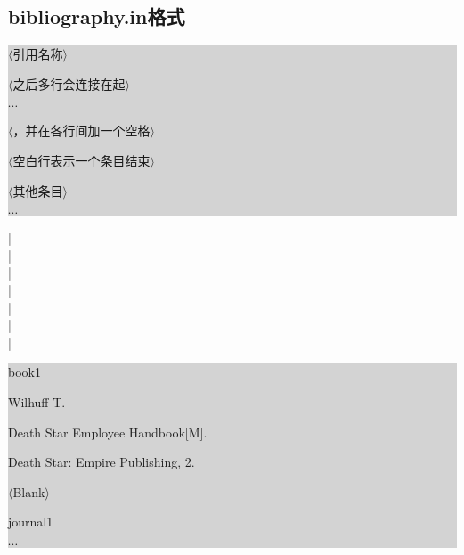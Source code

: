 \documentclass[a4paper]{article}
\begin{document}
	\subsection{bibliography.in格式}
	\begin{body}
		\colorbox{lightgray}{\parbox[t]{0.4\linewidth}{\setlength{\parindent}{0pt}%
				$\langle$引用名称$\rangle$\par
				$\langle$之后多行会连接在起$\rangle$\par
				\quad$\cdots$\par
				$\langle$，并在各行间加一个空格$\rangle$\par
				$\langle$空白行表示一个条目结束$\rangle$\par
				$\langle$其他条目$\rangle$\par
				\quad$\cdots$\par
		}}
		\parbox[t]{4pt}{\par|\\|\\|\\|\\|\\|\\|\par}
		\colorbox{lightgray}{\parbox[t]{0.4\linewidth}{\setlength{\parindent}{0pt}%
				book1\par
				Wilhuff T.\par
				Death Star Employee Handbook[M].\par
				Death Star: Empire Publishing, 2.\par
				$\langle$Blank$\rangle$\par
				journal1\par
				\quad$\cdots$\par
		}}
	\end{body}
\end{document}
